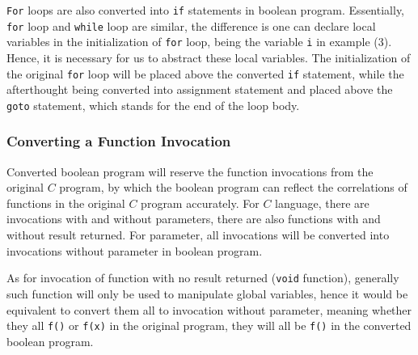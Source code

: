 \documentclass[10pt,journal,final,]{article}
\theoremstyle{definition}
\begin{document}
\lstinline|For| loops are also converted into \lstinline|if| statements in boolean program.
Essentially, \lstinline|for| loop and \lstinline|while| loop are similar, the difference is one can declare local variables in the initialization of \lstinline|for| loop, being the variable \lstinline|i| in example (3).
Hence, it is necessary for us to abstract these local variables.
The initialization of the original \lstinline|for| loop will be placed above the converted \lstinline|if| statement,
while the afterthought being converted into assignment statement and placed above the \lstinline|goto| statement, which stands for the end of the loop body.

\subsubsection{Converting a Function Invocation}
\label{section:ConvertingAFunctionInvocation}
Converted boolean program will reserve the function invocations from the original $C$ program, by which the boolean program can reflect the correlations of functions in the original $C$ program accurately.
For $C$ language, there are invocations with and without parameters, there are also functions with and without result returned. For parameter, all invocations will be converted into invocations without parameter in boolean program.

As for invocation of function with no result returned (\lstinline|void| function), generally such function will only be used to manipulate global variables, hence it would be equivalent to convert them all to invocation without parameter, meaning whether they all \lstinline|f()| or \lstinline|f(x)| in the original program, they will all be \lstinline|f()| in the converted boolean program.
\end{document}
